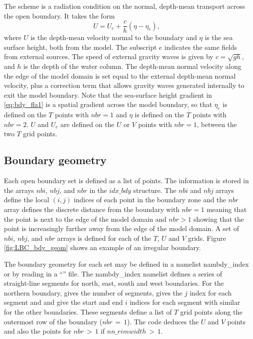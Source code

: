 \documentclass[../main/NEMO_manual]{subfiles}
\begin{document}
The \citet{Flather_JPO94} scheme is a radiation condition on the normal,
depth-mean transport across the open boundary.
It takes the form
\begin{equation}  \label{eq:bdy_fla1}
U = U_{e} + \frac{c}{h}\left(\eta - \eta_{e}\right),
\end{equation}
where $U$ is the depth-mean velocity normal to the boundary and $\eta$ is the sea surface height,
both from the model.
The subscript $e$ indicates the same fields from external sources.
The speed of external gravity waves is given by $c = \sqrt{gh}$, and $h$ is the depth of the water column.
The depth-mean normal velocity along the edge of the model domain is set equal to
the external depth-mean normal velocity,
plus a correction term that allows gravity waves generated internally to exit the model boundary.
Note that the sea-surface height gradient in \autoref{eq:bdy_fla1} is a spatial gradient across the model boundary,
so that $\eta_{e}$ is defined on the $T$ points with $nbr=1$ and $\eta$ is defined on the $T$ points with $nbr=2$.
$U$ and $U_{e}$ are defined on the $U$ or $V$ points with $nbr=1$, \ie between the two $T$ grid points.

\subsection{Boundary geometry}
\label{subsec:BDY_geometry}

Each open boundary set is defined as a list of points.
The information is stored in the arrays $nbi$, $nbj$, and $nbr$ in the $idx\_bdy$ structure.
The $nbi$ and $nbj$ arrays define the local $(i,j)$ indices of each point in the boundary zone and
the $nbr$ array defines the discrete distance from the boundary with $nbr=1$ meaning that
the point is next to the edge of the model domain and $nbr>1$ showing that
the point is increasingly further away from the edge of the model domain.
A set of $nbi$, $nbj$, and $nbr$ arrays is defined for each of the $T$, $U$ and $V$ grids.
Figure \autoref{fig:LBC_bdy_geom} shows an example of an irregular boundary. 

The boundary geometry for each set may be defined in a namelist nambdy\_index or
by reading in a ``'' file.
The nambdy\_index namelist defines a series of straight-line segments for north, east, south and west boundaries.
For the northern boundary,  gives the number of segments,
 gives the $j$ index for each segment and  and
 give the start and end $i$ indices for each segment with similar for the other boundaries.
These segments define a list of $T$ grid points along the outermost row of the boundary ($nbr\,=\, 1$).
The code deduces the $U$ and $V$ points and also the points for $nbr\,>\, 1$ if $nn\_rimwidth\,>\,1$.
\end{document}
